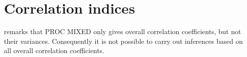 
\section{Correlation indices}
\citet{roy} remarks that PROC MIXED only gives overall correlation coefficients, but not their variances. Consequently it is not possible to carry out inferences based on all overall correlation coefficients.
